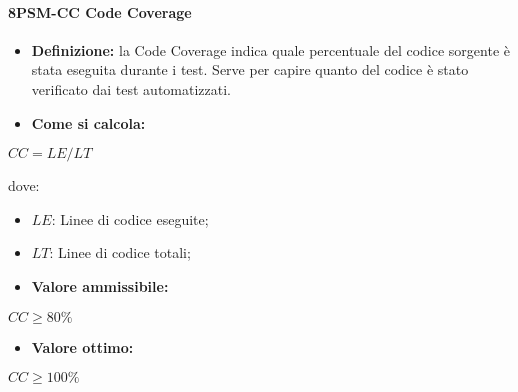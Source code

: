 \paragraph*{8PSM-CC Code Coverage}
\begin{itemize}
    \item \textbf{Definizione:} la Code Coverage indica quale percentuale del codice sorgente è stata eseguita durante i test. Serve per capire quanto del codice è stato verificato dai test automatizzati.
    \item \textbf{Come si calcola:}
\end{itemize}
\begin{center}
    $CC = LE/LT$ 
 \end{center}
 dove:
 \begin{itemize}[label=$\rightarrow$]
     \item $LE$: Linee di codice eseguite;
     \item $LT$: Linee di codice totali;
 \end{itemize}
\begin{itemize}
    \item \textbf{Valore ammissibile:}
\end{itemize}
\begin{center}
    $CC \geq 80\%$
\end{center}
\begin{itemize}
    \item \textbf{Valore ottimo:}
\end{itemize}
\begin{center}
    $CC \geq 100\%$
\end{center}

